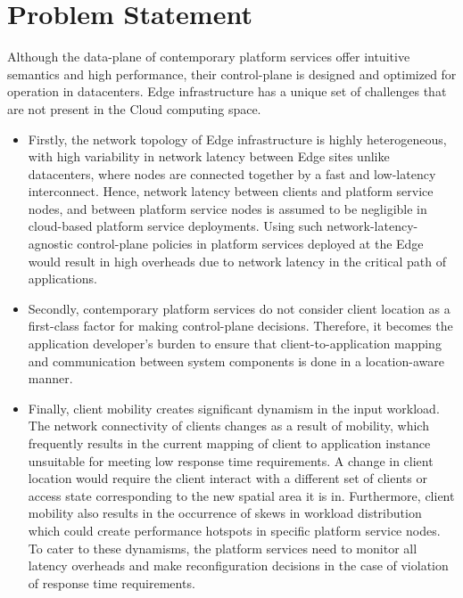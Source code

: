 \section{Problem Statement}

Although the data-plane of contemporary platform services offer intuitive semantics and high performance, their control-plane is designed and optimized for operation in datacenters. Edge infrastructure has a unique set of challenges that are not present in the Cloud computing space.
\begin{itemize}
    \item Firstly, the network topology of Edge infrastructure is highly heterogeneous, with high variability in network latency between Edge sites   unlike datacenters, where nodes are connected together by a fast and low-latency interconnect. Hence, network latency between clients and platform service nodes, and between platform service nodes is assumed to be negligible in cloud-based platform service deployments. Using such network-latency-agnostic control-plane policies in platform services deployed at the Edge would result in high overheads due to network latency in the critical path of applications.
    \item Secondly, contemporary platform services do not consider client location as a first-class factor for making control-plane decisions. Therefore, it becomes the application developer's burden to ensure that client-to-application mapping and communication between system components is done in a location-aware manner.
    \item Finally, client mobility creates significant dynamism in the input workload. The network connectivity of clients changes as a result of mobility, which frequently results in the current mapping of client to application instance unsuitable for meeting low response time requirements. A change in client location would require the client interact with a different set of clients or access state corresponding to the new spatial area it is in. Furthermore, client mobility also results in the occurrence of skews in workload distribution which could create performance hotspots in specific platform service nodes. To cater to these dynamisms, the platform services need to monitor all latency overheads and make reconfiguration decisions in the case of violation of response time requirements.
\end{itemize}


